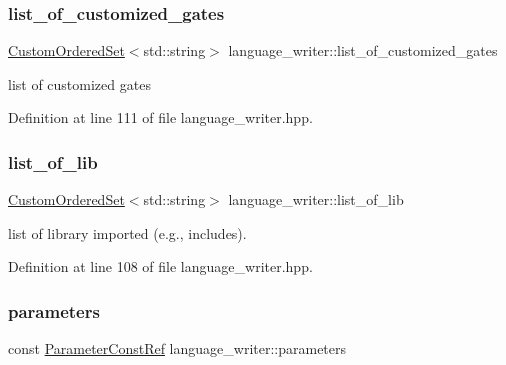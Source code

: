 \mbox{\label{classlanguage__writer_a4f37d553bed8fa6e09f4c0623ba3ec55}} 
\subsubsection{\texorpdfstring{list\+\_\+of\+\_\+customized\+\_\+gates}{list\_of\_customized\_gates}}
{\footnotesize\ttfamily \hyperlink{classCustomOrderedSet}{Custom\+Ordered\+Set}$<$std\+::string$>$ language\+\_\+writer\+::list\+\_\+of\+\_\+customized\+\_\+gates\hspace{0.3cm}{\ttfamily [protected]}}



list of customized gates 



Definition at line 111 of file language\+\_\+writer.\+hpp.

\mbox{\label{classlanguage__writer_a47561bf42c96b801a97bb476b85c0603}} 
\subsubsection{\texorpdfstring{list\+\_\+of\+\_\+lib}{list\_of\_lib}}
{\footnotesize\ttfamily \hyperlink{classCustomOrderedSet}{Custom\+Ordered\+Set}$<$std\+::string$>$ language\+\_\+writer\+::list\+\_\+of\+\_\+lib\hspace{0.3cm}{\ttfamily [protected]}}



list of library imported (e.\+g., includes). 



Definition at line 108 of file language\+\_\+writer.\+hpp.

\mbox{\label{classlanguage__writer_aeb717c1d12571e3808759009be752d59}} 
\subsubsection{\texorpdfstring{parameters}{parameters}}
{\footnotesize\ttfamily const \hyperlink{Parameter_8hpp_a37841774a6fcb479b597fdf8955eb4ea}{Parameter\+Const\+Ref} language\+\_\+writer\+::parameters\hspace{0.3cm}{\ttfamily [protected]}}



